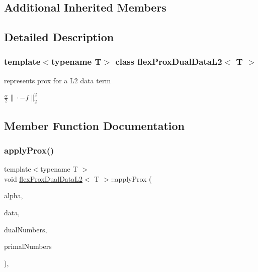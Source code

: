 \subsection*{Additional Inherited Members}


\subsection{Detailed Description}
\subsubsection*{template$<$typename T$>$\newline
class flex\+Prox\+Dual\+Data\+L2$<$ T $>$}

represents prox for a L2 data term 

$ \frac{\alpha}{2}\|\cdot-f\|_2^2 $ 

\subsection{Member Function Documentation}
\mbox{\label{classflex_prox_dual_data_l2_ae3ee176dc6c05e8fba0df96c73b10464}} 
\subsubsection{\texorpdfstring{apply\+Prox()}{applyProx()}\hspace{0.1cm}{\footnotesize\ttfamily [1/2]}}
{\footnotesize\ttfamily template$<$typename T $>$ \\
void \hyperlink{classflex_prox_dual_data_l2}{flex\+Prox\+Dual\+Data\+L2}$<$ T $>$\+::apply\+Prox (\begin{DoxyParamCaption}\item[{T}]{alpha,  }\item[{\hyperlink{classflex_box_data}{flex\+Box\+Data}$<$ T $>$ $\ast$}]{data,  }\item[{const std\+::vector$<$ int $>$ \&}]{dual\+Numbers,  }\item[{const std\+::vector$<$ int $>$ \&}]{primal\+Numbers }\end{DoxyParamCaption})\hspace{0.3cm}{\ttfamily [inline]}, {\ttfamily [virtual]}}



